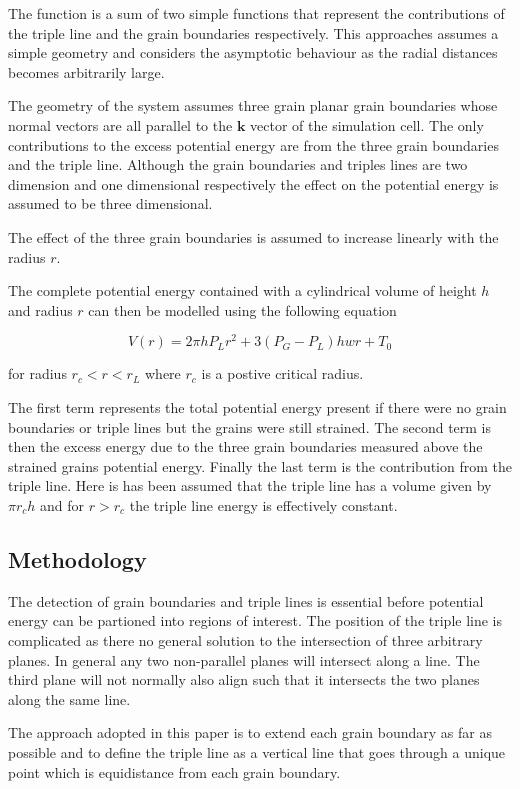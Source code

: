 \documentclass[12pt,a4paper]{book}
\begin{document}
The function is a sum of two simple functions that represent the contributions of the triple line and the grain boundaries respectively. This approaches assumes a simple geometry and considers the asymptotic behaviour as the radial distances becomes arbitrarily large.

The geometry of the system assumes three grain planar grain boundaries whose normal vectors are all parallel to the $\mathbf{k}$ vector of the simulation cell. The only contributions to the excess potential energy are from the three grain boundaries and the triple line. Although the grain boundaries and triples lines are two dimension and one dimensional respectively the effect on the potential energy is assumed to be three dimensional.

The effect of the three grain boundaries is assumed to increase linearly with the radius $r$. 


The complete potential energy contained with a cylindrical volume of height $h$ and radius $r$ can then be modelled using the following equation

\[ V(r) = 2 \pi h P_{L} r^2 + 3(P_G-P_L)h w r + T_0  
\]

for radius $r_c < r < r_L$ where $r_c$ is a postive critical radius.

The first term represents the total potential energy present if there were no grain boundaries or triple lines but the grains were still strained. The second term is then the excess energy due to the three grain boundaries measured above the strained grains potential energy. Finally the last term is the contribution from the triple line. Here is has been assumed that the triple line has a volume given by $\pi r_c h$ and for $r > r_c$ the triple line energy is effectively constant.

\subsection{Methodology}

The detection of grain boundaries and triple lines is essential before potential energy can be partioned into regions of interest. The position of the triple line is complicated as there no general solution to the intersection of three arbitrary planes. In general any two non-parallel planes will intersect along a line. The third plane will not normally also align such that it intersects the two planes along the same line.

The approach adopted in this paper is to extend each grain boundary as far as possible and to define the triple line as a vertical line that goes through a unique point which is equidistance from each grain boundary. 
\end{document}
